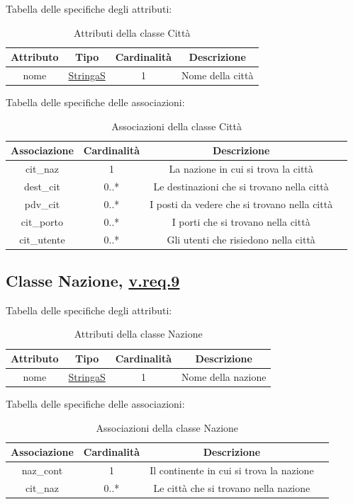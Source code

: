 \documentclass{article}
\begin{document}
Tabella delle specifiche degli attributi:
\begin{table}[h!]
    \centering
    \begin{tabular}{|c|c|c|c|}
        \hline
        Attributo & Tipo & Cardinalità & Descrizione \\
        \hline
        nome & \hyperref[sec:StringaS]{StringaS} & 1 & Nome della città \\
        \hline
    \end{tabular}
    \caption{Attributi della classe Città}
\end{table}

Tabella delle specifiche delle associazioni:
\begin{table}[h!]
    \centering
    \begin{tabular}{|c|c|c|c|}
        \hline
        Associazione & Cardinalità & Descrizione \\
        \hline
        cit\_naz & 1 & La nazione in cui si trova la città \\
        dest\_cit & 0..* & Le destinazioni che si trovano nella città \\
        pdv\_cit & 0..* & I posti da vedere che si trovano nella città \\
        cit\_porto & 0..* & I porti che si trovano nella città \\
        cit\_utente & 0..* & Gli utenti che risiedono nella città \\
        \hline
    \end{tabular}
    \caption{Associazioni della classe Città}
\end{table}
\subsection*{Classe Nazione, \hyperref[sec:RequisitiNazione]{v.req.9}}\label{sec:Nazione}

Tabella delle specifiche degli attributi:
\begin{table}[h!]
    \centering
    \begin{tabular}{|c|c|c|c|}
        \hline
        Attributo & Tipo & Cardinalità & Descrizione \\
        \hline
        nome & \hyperref[sec:StringaS]{StringaS} & 1 & Nome della nazione \\
        \hline
    \end{tabular}
    \caption{Attributi della classe Nazione}
\end{table}

Tabella delle specifiche delle associazioni:
\begin{table}[h!]
    \centering
    \begin{tabular}{|c|c|c|c|}
        \hline
        Associazione & Cardinalità & Descrizione \\
        \hline
        naz\_cont & 1 & Il continente in cui si trova la nazione \\
        cit\_naz & 0..* & Le città che si trovano nella nazione \\
        \hline
    \end{tabular}
    \caption{Associazioni della classe Nazione}
\end{table}
\end{document}
